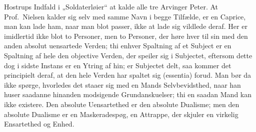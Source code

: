 Hostrups Indfald i „Soldaterløier“ at kalde alle tre Arvinger Peter. At Prof.\
Nielsen kalder sig selv med samme Navn i begge Tilfælde, er en Caprice, man
kan lade ham, naar man blot passer, ikke at lade sig vildlede deraf. Her er
imidlertid ikke blot to Personer, men to Personer, der høre hver til sin med
den anden absolut uensartede Verden; thi enhver Spaltning af et Subject er en
Spaltning af hele den objective Verden, der speiler sig i Subjectet, eftersom
dette dog i sidste Instans er en Ytring af hin; er Subjectet delt, saa kommer
det principielt deraf, at den hele Verden har spaltet sig (essentia) forud.
Man bør da ikke spørge, hvorledes det staaer sig med en Mands Selvbevidsthed,
naar han huser saadanne hinanden modsigende Grundanskuelser; thi en saadan
Mand kan ikke existere. Den absolute Uensartethed er den absolute Dualisme;
men den absolute Dualisme er en Maskeradespøg, en Attrappe, der skjuler en
virkelig Ensartethed og Enhed.

